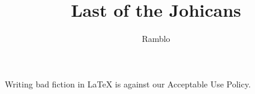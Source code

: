 \documentclass{article}
\title{Last of the Johicans}
\author{Ramblo}
\date{}
\begin{document}
	\maketitle
	Writing bad fiction in LaTeX is against our Acceptable Use Policy.
	
	
\end{document}
